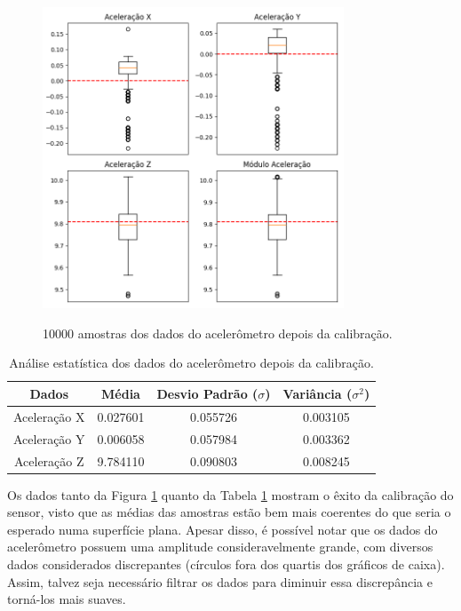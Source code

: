 \documentclass[acronym, symbols, table]{fei}
\begin{document}
	\begin{figure}[!htb]
		\centering
		\caption{10000 amostras dos dados do acelerômetro depois da calibração.}
		\includegraphics[width=0.8\textwidth]{dados_acelerometro_certos.png}
		\label{fig:dados_acelerometro_certos}
	\end{figure}
	
	\begin{table}[!htb]
		\centering
		\caption{Análise estatística dos dados do acelerômetro depois da calibração.}\label{tab:acelerometro_depois_calibracao}
		\begin{tabular}{|c|c|c|c|}
			\hline
			Dados & Média & Desvio Padrão ($\sigma$) & Variância ($\sigma^2$) \\ \hline
			\small Aceleração X & 0.027601  & 0.055726 & 0.003105 \\ \hline
			\small Aceleração Y & 0.006058  & 0.057984 & 0.003362 \\ \hline
			\small Aceleração Z & 9.784110  & 0.090803 & 0.008245 \\ \hline			
		\end{tabular}
	\end{table}
	
	Os dados tanto da Figura \ref{fig:dados_acelerometro_certos} quanto da Tabela \ref{tab:acelerometro_depois_calibracao} mostram o êxito da calibração do sensor, visto que as médias das amostras estão bem mais coerentes do que seria o esperado numa superfície plana. Apesar disso, é possível notar que os dados do acelerômetro possuem uma amplitude consideravelmente grande, com diversos dados considerados discrepantes (círculos fora dos quartis dos gráficos de caixa). Assim, talvez seja necessário filtrar os dados para diminuir essa discrepância e torná-los mais suaves.
	
\end{document}
